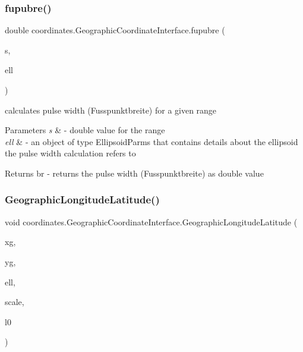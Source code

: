 \subsubsection{\texorpdfstring{fupubre()}{fupubre()}}
{\footnotesize\ttfamily double coordinates.\+Geographic\+Coordinate\+Interface.\+fupubre (\begin{DoxyParamCaption}\item[{double}]{s,  }\item[{\hyperlink{classparams_1_1_ellipsoid_parms}{Ellipsoid\+Parms}}]{ell }\end{DoxyParamCaption})}



calculates pulse width (Fusspunktbreite) for a given range 


\begin{DoxyParams}{Parameters}
{\em s} & -\/ double value for the range \\
\hline
{\em ell} & -\/ an object of type Ellipsoid\+Parms that contains details about the ellipsoid the pulse width calculation refers to \\
\hline
\end{DoxyParams}
\begin{DoxyReturn}{Returns}
br -\/ returns the pulse width (Fusspunktbreite) as double value 
\end{DoxyReturn}
\mbox{\label{classcoordinates_1_1_geographic_coordinate_interface_a1054ed7d1c0497e91fcc4f098c06e1e5}} 
\subsubsection{\texorpdfstring{Geographic\+Longitude\+Latitude()}{GeographicLongitudeLatitude()}}
{\footnotesize\ttfamily void coordinates.\+Geographic\+Coordinate\+Interface.\+Geographic\+Longitude\+Latitude (\begin{DoxyParamCaption}\item[{double}]{xg,  }\item[{double}]{yg,  }\item[{\hyperlink{classparams_1_1_ellipsoid_parms}{Ellipsoid\+Parms}}]{ell,  }\item[{double}]{scale,  }\item[{double}]{l0 }\end{DoxyParamCaption})}



